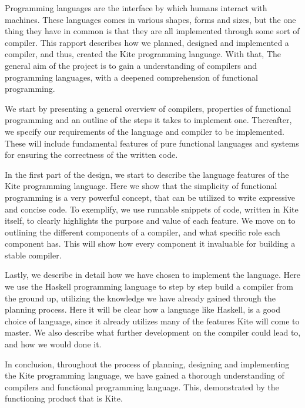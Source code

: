
Programming languages are the interface by which humans interact with machines. These languages comes in various shapes, forms and sizes, but the one thing they have in common is that they are all implemented through some sort of compiler. This rapport describes how we planned, designed and implemented a compiler, and thus, created the Kite programming language. With that, The general aim of the project is to gain a understanding of compilers and programming languages, with a deepened comprehension of functional programming.

We start by presenting a general overview of compilers, properties of functional programming and an outline of the steps it takes to implement one. Thereafter, we specify our requirements of the language and compiler to be implemented. These will include fundamental features of pure functional languages and systems for ensuring the correctness of the written code.

In the first part of the design, we start to describe the language features of the Kite programming language. Here we show that the simplicity of functional programming is a very powerful concept, that can be utilized to write expressive and concise code. To exemplify, we use runnable snippets of code, written in Kite itself, to clearly highlights the purpose and value of each feature. We move on to outlining the different components of a compiler, and what specific role each component has. This will show how every component it invaluable for building a stable compiler.

Lastly, we describe in detail how we have chosen to implement the language. Here we use the Haskell programming language to step by step build a compiler from the ground up, utilizing the knowledge we have already gained through the planning process. Here it will be clear how a language like Haskell, is a good choice of language, since it already utilizes many of the features Kite will come to master. We also describe what further development on the compiler could lead to, and how we would done it.

In conclusion, throughout the process of planning, designing and implementing the Kite programming language, we have gained a thorough understanding of compilers and functional programming language. This, demonstrated by the functioning product that is Kite.